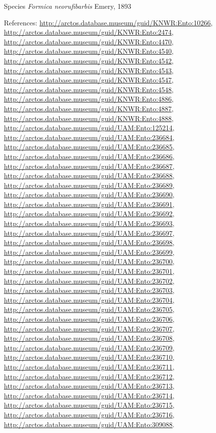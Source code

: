 \documentclass[9pt, article]{memoir}
\begin{document}
\begin{multicols}{2}
\vspace{6pt}\noindent\hspace{36pt}Species \textit{Formica neorufibarbis} Emery, 1893


References: 
\url{http://arctos.database.museum/guid/KNWR:Ento:10266}, 
\url{http://arctos.database.museum/guid/KNWR:Ento:2474}, 
\url{http://arctos.database.museum/guid/KNWR:Ento:4470}, 
\url{http://arctos.database.museum/guid/KNWR:Ento:4540}, 
\url{http://arctos.database.museum/guid/KNWR:Ento:4542}, 
\url{http://arctos.database.museum/guid/KNWR:Ento:4543}, 
\url{http://arctos.database.museum/guid/KNWR:Ento:4547}, 
\url{http://arctos.database.museum/guid/KNWR:Ento:4548}, 
\url{http://arctos.database.museum/guid/KNWR:Ento:4886}, 
\url{http://arctos.database.museum/guid/KNWR:Ento:4887}, 
\url{http://arctos.database.museum/guid/KNWR:Ento:4888}, 
\url{http://arctos.database.museum/guid/UAM:Ento:125214}, 
\url{http://arctos.database.museum/guid/UAM:Ento:236684}, 
\url{http://arctos.database.museum/guid/UAM:Ento:236685}, 
\url{http://arctos.database.museum/guid/UAM:Ento:236686}, 
\url{http://arctos.database.museum/guid/UAM:Ento:236687}, 
\url{http://arctos.database.museum/guid/UAM:Ento:236688}, 
\url{http://arctos.database.museum/guid/UAM:Ento:236689}, 
\url{http://arctos.database.museum/guid/UAM:Ento:236690}, 
\url{http://arctos.database.museum/guid/UAM:Ento:236691}, 
\url{http://arctos.database.museum/guid/UAM:Ento:236692}, 
\url{http://arctos.database.museum/guid/UAM:Ento:236693}, 
\url{http://arctos.database.museum/guid/UAM:Ento:236697}, 
\url{http://arctos.database.museum/guid/UAM:Ento:236698}, 
\url{http://arctos.database.museum/guid/UAM:Ento:236699}, 
\url{http://arctos.database.museum/guid/UAM:Ento:236700}, 
\url{http://arctos.database.museum/guid/UAM:Ento:236701}, 
\url{http://arctos.database.museum/guid/UAM:Ento:236702}, 
\url{http://arctos.database.museum/guid/UAM:Ento:236703}, 
\url{http://arctos.database.museum/guid/UAM:Ento:236704}, 
\url{http://arctos.database.museum/guid/UAM:Ento:236705}, 
\url{http://arctos.database.museum/guid/UAM:Ento:236706}, 
\url{http://arctos.database.museum/guid/UAM:Ento:236707}, 
\url{http://arctos.database.museum/guid/UAM:Ento:236708}, 
\url{http://arctos.database.museum/guid/UAM:Ento:236709}, 
\url{http://arctos.database.museum/guid/UAM:Ento:236710}, 
\url{http://arctos.database.museum/guid/UAM:Ento:236711}, 
\url{http://arctos.database.museum/guid/UAM:Ento:236712}, 
\url{http://arctos.database.museum/guid/UAM:Ento:236713}, 
\url{http://arctos.database.museum/guid/UAM:Ento:236714}, 
\url{http://arctos.database.museum/guid/UAM:Ento:236715}, 
\url{http://arctos.database.museum/guid/UAM:Ento:236716}, 
\url{http://arctos.database.museum/guid/UAM:Ento:309088}.


\end{multicols}
\end{document}
